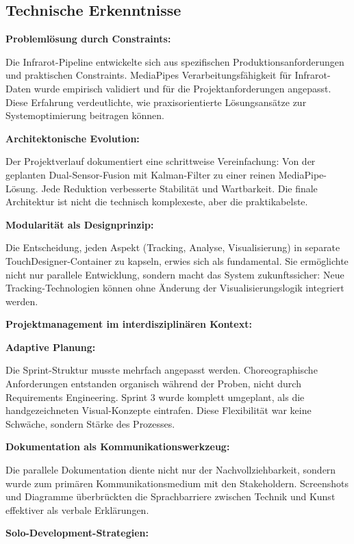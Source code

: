 
\subsection{Technische Erkenntnisse}

\textbf{Problemlösung durch Constraints:}

\raggedright Die Infrarot-Pipeline entwickelte sich aus spezifischen Produktionsanforderungen und praktischen Constraints. MediaPipes Verarbeitungsfähigkeit für Infrarot-Daten wurde empirisch validiert und für die Projektanforderungen angepasst. Diese Erfahrung verdeutlichte, wie praxisorientierte Lösungsansätze zur Systemoptimierung beitragen können.

\textbf{Architektonische Evolution:}

\raggedright Der Projektverlauf dokumentiert eine schrittweise Vereinfachung: Von der geplanten Dual-Sensor-Fusion mit Kalman-Filter zu einer reinen MediaPipe-Lösung. Jede Reduktion verbesserte Stabilität und Wartbarkeit. Die finale Architektur ist nicht die technisch komplexeste, aber die praktikabelste.

\textbf{Modularität als Designprinzip:}

\raggedright Die Entscheidung, jeden Aspekt (Tracking, Analyse, Visualisierung) in separate TouchDesigner-Container zu kapseln, erwies sich als fundamental. Sie ermöglichte nicht nur parallele Entwicklung, sondern macht das System zukunftssicher: Neue Tracking-Technologien können ohne Änderung der Visualisierungslogik integriert werden.

\textbf{Projektmanagement im interdisziplinären Kontext:}

\textbf{Adaptive Planung:}

\raggedright Die Sprint-Struktur musste mehrfach angepasst werden. Choreographische Anforderungen entstanden organisch während der Proben, nicht durch Requirements Engineering. Sprint 3 wurde komplett umgeplant, als die handgezeichneten Visual-Konzepte eintrafen. Diese Flexibilität war keine Schwäche, sondern Stärke des Prozesses.

\textbf{Dokumentation als Kommunikationswerkzeug:}

\raggedright Die parallele Dokumentation diente nicht nur der Nachvollziehbarkeit, sondern wurde zum primären Kommunikationsmedium mit den Stakeholdern. Screenshots und Diagramme überbrückten die Sprachbarriere zwischen Technik und Kunst effektiver als verbale Erklärungen.

\textbf{Solo-Development-Strategien:}

